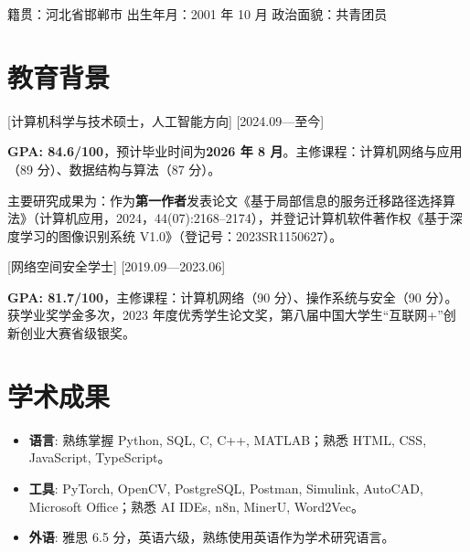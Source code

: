 \documentclass{resume}
\begin{document}


\ResumeTitle
\vspace{-0.8em}
\begin{center}
  籍贯：河北省邯郸市 \quad 出生年月：2001 年 10 月 \quad 政治面貌：共青团员
\end{center}
\vspace{-0.4em}

\section{教育背景}
[\textnormal{计算机科学与技术硕士，人工智能方向}]
[2024.09—至今]

\textbf{GPA: 84.6/100}，预计毕业时间为\textbf{2026 年 8 月}。主修课程：计算机网络与应用（89 分）、数据结构与算法（87 分）。

主要研究成果为：作为\textbf{第一作者}发表论文《基于局部信息的服务迁移路径选择算法》（计算机应用，2024，44(07):2168--2174），并登记计算机软件著作权《基于深度学习的图像识别系统 V1.0》（登记号：2023SR1150627）。

[\textnormal{网络空间安全学士}]
[2019.09—2023.06]

\textbf{GPA: 81.7/100}，主修课程：计算机网络（90 分）、操作系统与安全（90 分）。获学业奖学金多次，2023 年度优秀学生论文奖，第八届中国大学生“互联网+”创新创业大赛省级银奖。

\section{学术成果}
\begin{itemize}
  \item \textbf{语言}: 熟练掌握 Python, SQL, C, C++, MATLAB；熟悉 HTML, CSS, JavaScript, TypeScript。
  \item \textbf{工具}: PyTorch, OpenCV, PostgreSQL, Postman, Simulink, AutoCAD, Microsoft Office；熟悉 AI IDEs, n8n, MinerU, Word2Vec。
  \item \textbf{外语}: 雅思 6.5 分，英语六级，熟练使用英语作为学术研究语言。
\end{itemize}
\end{document}
